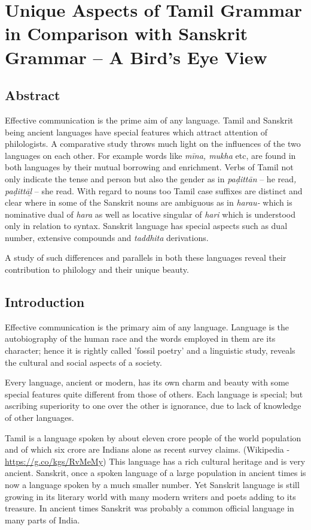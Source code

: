
\chapter{Unique Aspects of Tamil Grammar in Comparison with Sanskrit Grammar – A Bird’s Eye View}\label{chap05}



\section*{Abstract}

Effective communication is the prime aim of any language. Tamil and Sanskrit being ancient languages have special features which attract attention of philologists. A comparative study throws much light on the influences of the two languages on each other. For example words like \textit{mīna, mukha} etc, are found in both languages by their mutual borrowing and enrichment. Verbs of Tamil not only indicate the tense and person but also the gender as in \textit{paḍittān} – he read\textit{, paḍittāḻ} – she read. With regard to nouns too Tamil case suffixes are distinct and clear where in some of the Sanskrit nouns are ambiguous as in \textit{harau-} which is nominative dual of \textit{hara} as well as locative singular of \textit{hari} which is understood only in relation to syntax. Sanskrit language has special aspects such as dual number, extensive compounds and \textit{taddhita} derivations.

A study of such differences and parallels in both these languages reveal their contribution to philology and their unique beauty.


\section*{Introduction}

Effective communication is the primary aim of any language. Language is the autobiography of the human race and the words employed in them are its character; hence it is rightly called 'fossil poetry’ and a linguistic study, reveals the cultural and social aspects of a society.

Every language, ancient or modern, has its own charm and beauty with some special features quite different from those of others. Each language is special; but ascribing superiority to one over the other is ignorance, due to lack of knowledge of other languages.

Tamil is a language spoken by about eleven crore people of the world population and of which six crore are Indians alone as recent survey claims. (Wikipedia - \url{https://g.co/kgs/RvMeMy}) This language has a rich cultural heritage and is very ancient. Sanskrit, once a spoken language of a large population in ancient times is now a language spoken by a much smaller number. Yet Sanskrit language is still growing in its literary world with many modern writers and poets adding to its treasure. In ancient times Sanskrit was probably a common official language in many parts of India.

